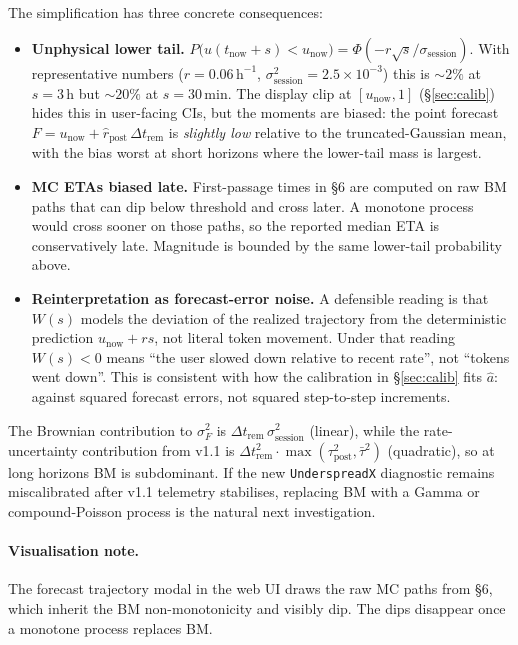 \documentclass[11pt]{article}
\newcommand{\rpost}{\hat r_{\text{post}}}
\newcommand{\taupostsq}{\tau_{\text{post}}^2}
\newcommand{\sigsessionsq}{\sigma_{\text{session}}^2}
\newcommand{\unow}{u_{\text{now}}}
\newcommand{\tnow}{t_{\text{now}}}
\newcommand{\Dtrem}{\Delta t_{\text{rem}}}
\begin{document}
\medskip
The simplification has three concrete consequences:

\begin{itemize}
  \item \textbf{Unphysical lower tail.} $P\!\bigl(u(\tnow+s) < \unow\bigr)
    = \Phi(-r\sqrt{s}/\sigma_{\text{session}})$. With representative
    numbers ($r = 0.06\,\mathrm{h}^{-1}$, $\sigsessionsq = 2.5 \times
    10^{-3}$) this is $\sim 2\%$ at $s = 3\,\mathrm{h}$ but $\sim 20\%$ at
    $s = 30\,\mathrm{min}$. The display clip at $[\unow, 1]$
    (\S\ref{sec:calib}) hides this in user-facing CIs, but the moments
    are biased: the point forecast $F = \unow + \rpost\,\Dtrem$ is
    \emph{slightly low} relative to the truncated-Gaussian mean, with the
    bias worst at short horizons where the lower-tail mass is largest.
  \item \textbf{MC ETAs biased late.} First-passage times in \S6 are
    computed on raw BM paths that can dip below threshold and cross
    later. A monotone process would cross sooner on those paths, so the
    reported median ETA is conservatively late. Magnitude is bounded by
    the same lower-tail probability above.
  \item \textbf{Reinterpretation as forecast-error noise.} A defensible
    reading is that $W(s)$ models the deviation of the realized
    trajectory from the deterministic prediction $\unow + rs$, not literal
    token movement. Under that reading $W(s) < 0$ means ``the user slowed
    down relative to recent rate'', not ``tokens went down''. This is
    consistent with how the calibration in \S\ref{sec:calib} fits $\hat
    a$: against squared forecast errors, not squared step-to-step
    increments.
\end{itemize}

\medskip
The Brownian contribution to $\sigma_F^2$ is $\Dtrem\,\sigsessionsq$
(linear), while the rate-uncertainty contribution from v1.1 is
$\Dtrem^2 \cdot \max(\taupostsq, \bar\tau^2)$ (quadratic), so at long
horizons BM is subdominant. If the new \texttt{UnderspreadX} diagnostic
remains miscalibrated after v1.1 telemetry stabilises, replacing BM with a
Gamma or compound-Poisson process is the natural next investigation.

\paragraph{Visualisation note.} The forecast trajectory modal in the web
UI draws the raw MC paths from \S6, which inherit the BM non-monotonicity
and visibly dip. The dips disappear once a monotone process replaces BM.
\end{document}
